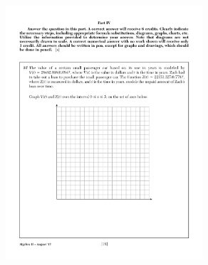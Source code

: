 \documentclass[]{book}
\begin{document}
\begin{enumerate}
\begin{figure}[!ht]
    \flushright
    \includegraphics[width=0.65\textwidth]{1stQ-grid.pdf}
\end{figure}

\end{enumerate}
\end{document}
